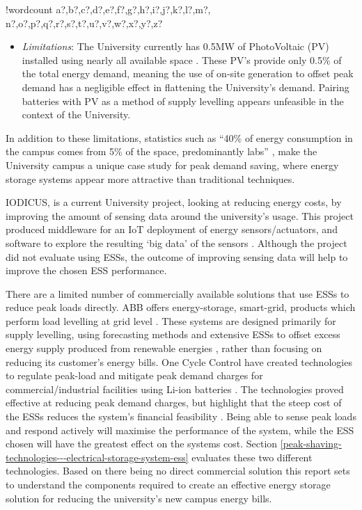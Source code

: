 \documentclass[fontsize=9.5pt]{extarticle}
\numberwithin{figure}{section} %
\providecommand{\tightlist}{%
  \setlength{\itemsep}{0pt}\setlength{\parskip}{0pt}}
\newcounter{words}
\newenvironment{counted}{%
  \setcounter{words}{0}
  \SearchList!{wordcount}{\stepcounter{words}}
    {a?,b?,c?,d?,e?,f?,g?,h?,i?,j?,k?,l?,m?,
    n?,o?,p?,q?,r?,s?,t?,u?,v?,w?,x?,y?,z?}
  \UndoBoundary{'}
  \SearchOrder{p;}}{%
  \StopSearching}
\begin{document}
\begin{counted}
\begin{itemize}
  \begin{itemize}
  \tightlist
  \item
    \emph{Limitations}: The University currently has 0.5MW of
    PhotoVoltaic (PV) installed using nearly all available space
    \cite{Jbrentmeet}. These PV's provide only 0.5\% of the total energy
    demand, meaning the use of on-site generation to offset peak demand
    has a negligible effect in flattening the University's demand.
    Pairing batteries with PV as a method of supply levelling appears
    unfeasible in the context of the University.
  \end{itemize}
\end{itemize}

In addition to these limitations, statistics such as ``40\% of energy
consumption in the campus comes from 5\% of the space, predominantly
labs'' \cite{brentemail}, make the University campus a unique case study
for peak demand saving, where energy storage systems appear more
attractive than traditional techniques.

IODICUS, is a current University project, looking at reducing energy
costs, by improving the amount of sensing data around the university's
usage. This project produced middleware for an IoT deployment of energy
sensors/actuators, and software to explore the resulting `big data' of
the sensors \cite{priestemail}. Although the project did not evaluate
using ESSs, the outcome of improving sensing data will help to improve
the chosen ESS performance.

There are a limited number of commercially available solutions that use
ESSs to reduce peak loads directly. ABB offers energy-storage,
smart-grid, products which perform load levelling at grid level
\cite{abbpeakshave}. These systems are designed primarily for supply
levelling, using forecasting methods and extensive ESSs to offset excess
energy supply produced from renewable energies \cite{5559470}, rather
than focusing on reducing its customer's energy bills. One Cycle Control
have created technologies to regulate peak-load and mitigate peak demand
charges for commercial/industrial facilities using Li-ion batteries
\cite{peakload38:online}. The technologies proved effective at reducing
peak demand charges, but highlight that the steep cost of the ESSs
reduces the system's financial feasibility \cite{Demonstr51:online}.
Being able to sense peak loads and respond actively will maximise the
performance of the system, while the ESS chosen will have the greatest
effect on the systems cost. Section
\ref{peak-shaving-technologies---electrical-storage-system-ess}
evaluates these two different technologies. Based on there being no
direct commercial solution this report sets to understand the components
required to create an effective energy storage solution for reducing the
university's new campus energy bills.


\end{counted}
\end{document}
